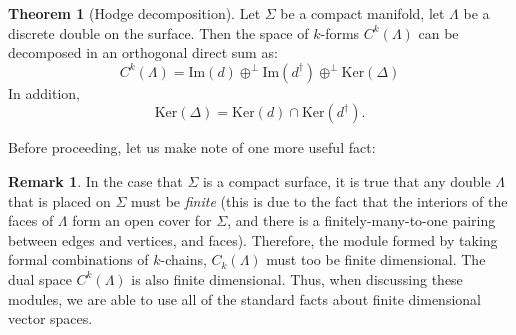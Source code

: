 \documentclass[aps,pra,showpacs,notitlepage,onecolumn,superscriptaddress,nofootinbib]{revtex4-1}
\theoremstyle{definition}
\newtheorem{theorem}{Theorem}[section]
\newtheorem{remark}{Remark}[section]
\newcommand{\hhrulefill}{\hspace{-1.5em} \hrulefill}
\begin{document}
\hhrulefill

\begin{theorem}[Hodge decomposition]
  Let $\Sigma$ be a compact manifold, let $\Lambda$ be a discrete double on the surface. Then the space
  of $k$-forms $C^{k}(\Lambda)$ can be decomposed in an orthogonal direct sum as:
  \begin{equation}
    C^{k}(\Lambda) = \text{Im}(d) \oplus^{\perp} \text{Im}(d^{\dagger}) \oplus^{\perp} \text{Ker}(\Delta)
  \end{equation}
  In addition,
  \begin{equation}
    \text{Ker}(\Delta) = \text{Ker}(d) \cap \text{Ker}(d^{\dagger}).
  \end{equation}
 \end{theorem}

\hhrulefill
\newline

\noindent Before proceeding, let us make note of one more useful fact:

\begin{remark}
  In the case that $\Sigma$ is a compact surface, it is true that any double $\Lambda$ that is placed on $\Sigma$ must be \emph{finite} (this is due to the fact that the interiors of the faces of $\Lambda$ form
  an open cover for $\Sigma$, and there is a finitely-many-to-one pairing between edges and vertices, and faces). Therefore, the module formed by taking formal combinations of $k$-chains, $C_k(\Lambda)$ must too be finite dimensional.
  The dual space $C^{k}(\Lambda)$ is also finite dimensional. Thus, when discussing these modules, we are able to use all of the standard facts about finite dimensional vector spaces.
\end{remark}

\hhrulefill
\newline
\end{document}
